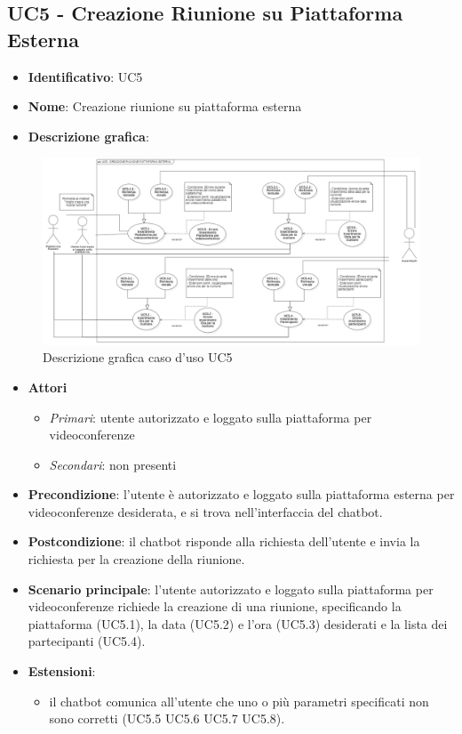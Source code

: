 \subsection{UC5 - Creazione Riunione su Piattaforma Esterna}
\begin{itemize}
    \item \textbf{Identificativo}: UC5
    \item \textbf{Nome}: Creazione riunione su piattaforma esterna
    \item \textbf{Descrizione grafica}:
\end{itemize}

\begin{figure}[h]
   \centering
   \includegraphics[scale=0.43]{images/UC5.png} 
   \caption{Descrizione grafica caso d'uso UC5}
\end{figure}

 \begin{itemize}
    \item \textbf{Attori}
 \begin{itemize} 
    \item \textit{Primari}: utente autorizzato e loggato sulla piattaforma per videoconferenze
    \item \textit{Secondari}: non presenti
 \end{itemize}
 \item \textbf{Precondizione}: l'utente è autorizzato e loggato sulla piattaforma esterna per videoconferenze desiderata, e si trova nell'interfaccia del chatbot.
 \item \textbf{Postcondizione}: il chatbot risponde alla richiesta dell'utente e invia la richiesta per la creazione della riunione.
 \item \textbf{Scenario principale}: l'utente autorizzato e loggato sulla piattaforma per videoconferenze richiede la creazione di una riunione, specificando la piattaforma (UC5.1), la data (UC5.2) e l'ora (UC5.3) desiderati e la lista dei partecipanti (UC5.4).
 \item \textbf{Estensioni}: 
 \begin{itemize} 
    \item il chatbot comunica all'utente che uno o più parametri specificati non sono corretti (UC5.5 UC5.6 UC5.7 UC5.8).
 \end{itemize}
\end{itemize}
\newpage


